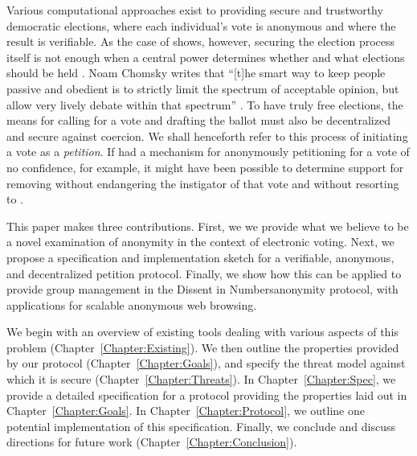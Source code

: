 Various computational approaches exist to providing secure and trustworthy
democratic elections, where each individual's vote is anonymous and where the
result is verifiable. As the case of \Tyrant shows, however, securing the
election process itself is not enough when a central power determines whether
and what elections should be held .
Noam Chomsky writes that
``[t]he smart way to keep people passive and obedient is to strictly limit the
spectrum of acceptable opinion, but allow very lively debate within that
spectrum'' \cite{chomsky1998common}. To have truly free elections, the means for
calling for a vote and drafting the ballot must also be decentralized and secure
against coercion. We shall henceforth refer to this process of initiating a vote
as a \emph{petition}. If \Congress had a mechanism for anonymously petitioning
for a vote of no confidence, for example, it might have been possible to
determine support for removing \Tyrant without endangering the instigator of
that vote and without resorting to \War.
%

This paper makes three contributions. First, we we provide what we believe to be
a novel examination of anonymity in the context of electronic voting. Next, we
propose a specification and implementation sketch for a verifiable, anonymous,
and decentralized petition protocol. Finally, we show how this can be applied to
provide group management in the Dissent in Numbers\tocite anonymity protocol,
with applications for scalable anonymous web browsing.

We begin with an overview of existing tools dealing with various aspects of this
problem (Chapter~\ref{Chapter:Existing}).  We then outline the properties
provided by our protocol (Chapter~\ref{Chapter:Goals}), and specify the threat
model against which it is secure (Chapter~\ref{Chapter:Threats}).  In
Chapter~\ref{Chapter:Spec}, we provide a detailed specification for a protocol
providing the properties laid out in Chapter~\ref{Chapter:Goals}. In
Chapter~\ref{Chapter:Protocol}, we outline one potential implementation of this
specification. Finally, we conclude and discuss
directions for future work (Chapter~\ref{Chapter:Conclusion}).

